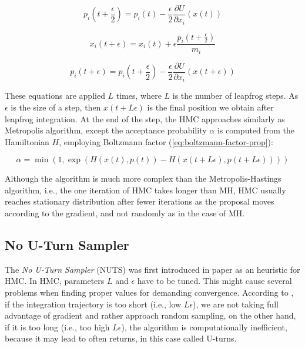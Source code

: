 \documentclass[
  digital, %
  oneside, %
  lof,     %
  lot,     %
]{fithesis4}
\begin{document}
\begin{equation}
  p_i \left(t + \frac{\epsilon}{2} \right) = p_i(t) - \frac{\epsilon}{2} \frac{\partial U}{\partial x_i} (x(t))
\end{equation}

\begin{equation}
  x_i(t + \epsilon) = x_i(t) + \epsilon \frac{p_i \left(t + \frac{\epsilon}{2} \right)}{m_i}
\end{equation}

\begin{equation}
  p_i(t + \epsilon) = p_i \left( t + \frac{\epsilon}{2} \right) - \frac{\epsilon}{2} \frac{\partial U}{\partial x_i} \left( x \left( t + \epsilon \right) \right)
\end{equation}

These equations are applied $L$ times, where $L$ is the number of leapfrog steps. 
As $\epsilon$ is the size of a step, then $x(t + L \epsilon)$ is the final position we obtain after leapfrog integration.
At the end of the step, the HMC approaches similarly as Metropolis algorithm, except the acceptance probability $\alpha$ is computed from the Hamiltonian $H$, employing Boltzmann factor (\eqref{eq:boltzmann-factor-prop}):

\begin{equation}
  \alpha = \min \left( 1, \exp \left( H(x(t), p(t)) - H(x(t + L \epsilon), p(t + L \epsilon)) \right) \right)
\end{equation}

Although the algorithm is much more complex than the Metropolis-Hastings algorithm, i.e., the one iteration of HMC takes longer than MH, HMC usually reaches stationary distribution after fewer iterations as the proposal moves according to the gradient, and not randomly as in the case of MH.


\subsection{No U-Turn Sampler}
\label{sec:nuts}

The \textit{No U-Turn Sampler} (NUTS) was first introduced in 
paper \cite{hoffman2011} as an heuristic for HMC. 
In HMC, parameters $L$ and $\epsilon$ have to be tuned. 
This might cause several problems when finding proper values for demanding convergence.
According to \cite{betancourt2018}, if the integration trajectory is too short (i.e., low $L\epsilon$), we are not taking full advantage of gradient and rather approach random sampling, on the other hand, if it is too long (i.e., too high $L\epsilon$), the algorithm is computationally inefficient, because it may lead to often returns, in this case called U-turns.
\end{document}
